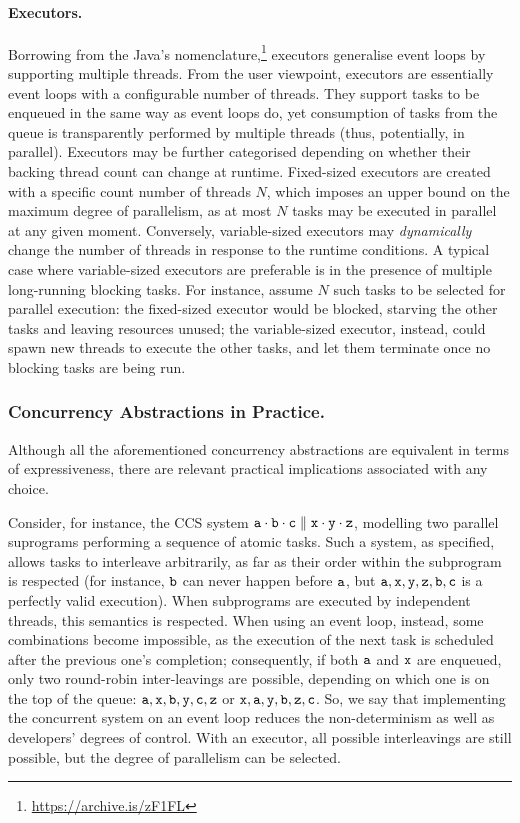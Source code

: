 \paragraph{Executors.}

Borrowing from the Java's nomenclature,\footnote{\url{https://archive.is/zF1FL}}
executors generalise event loops by supporting multiple threads.
%
From the user viewpoint, 
executors are essentially event loops with a configurable number of threads.
%
They support tasks to be enqueued in the same way as event loops do,
yet consumption of tasks from the queue is transparently performed by multiple threads
(thus, potentially, in parallel).
%
Executors may be further categorised depending on whether their backing thread count can change at runtime.
%
Fixed-sized executors are created with a specific count number of threads $N$,
which imposes an upper bound on the maximum degree of parallelism,
as at most $N$ tasks may be executed in parallel at any given moment.
%
Conversely, variable-sized executors may \emph{dynamically} change the number of threads in response to the runtime conditions.
%
A typical case where variable-sized executors are preferable is in the presence of multiple long-running blocking tasks.
%
For instance,
assume $N$ such tasks to be selected for parallel execution:
the fixed-sized executor would be blocked, starving the other tasks and leaving resources unused;
the variable-sized executor, instead, could spawn new threads to execute the other tasks,
and let them terminate once no blocking tasks are being run.

\subsubsection{Concurrency Abstractions in Practice.}

Although all the aforementioned concurrency abstractions are equivalent in terms of expressiveness,
there are relevant practical implications associated with any choice.

Consider, for instance, the \ac{CCS} system
$\T{a} \cdot \T{b} \cdot \T{c} \parallel \T{x} \cdot \T{y} \cdot \T{z}$,
modelling two parallel suprograms performing a sequence of atomic tasks.
%
Such a system, as specified, allows tasks to interleave arbitrarily,
as far as their order within the subprogram is respected
(for instance, $\T{b}$ can never happen before $\T{a}$, but $\T{a}, \T{x}, \T{y}, \T{z}, \T{b}, \T{c}$ is a perfectly valid execution).
%
When subprograms are executed by independent threads, this semantics is respected.
%
When using an event loop,
instead, some combinations become impossible,
as the execution of the next task is scheduled after the previous one's completion;
consequently,
if both $\T{a}$ and $\T{x}$ are enqueued,
only two round-robin inter-leavings are possible,
depending on which one is on the top of the queue:
$\T{a}, \T{x}, \T{b}, \T{y}, \T{c}, \T{z}$ or $\T{x}, \T{a}, \T{y}, \T{b}, \T{z}, \T{c}$.
%
So, we say that implementing the concurrent system on an event loop reduces the non-determinism as well as developers' degrees of control.
%
With an executor,
all possible interleavings are still possible,
but the degree of parallelism can be selected.

